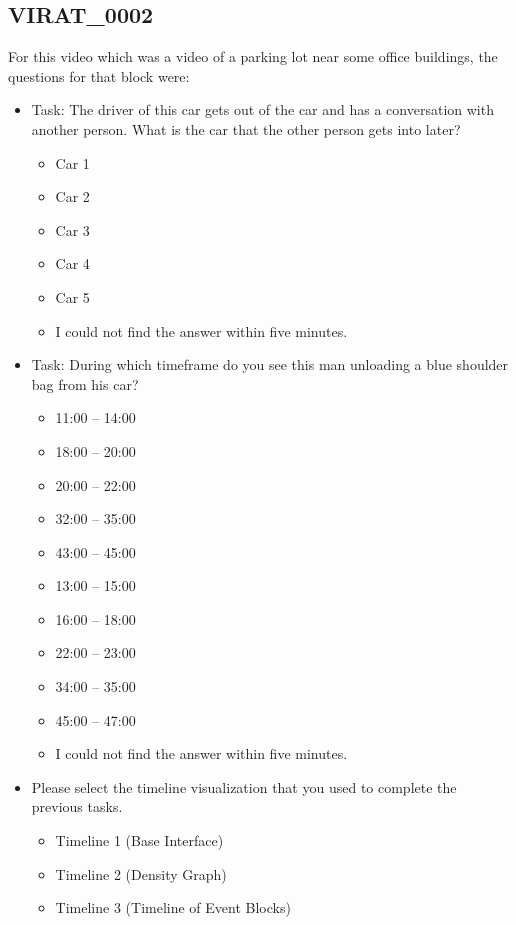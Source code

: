 \documentclass[doublespace,draft,nopageskip]{VTthesis} %
\begin{document}
\subsection{VIRAT_0002}

For this video which was a video of a parking lot near some office buildings, the questions for that block were: 

\begin{itemize}
    \item Task: The driver of this car gets out of the car and has a conversation with another person. What is the car that the other person gets into later?
    \begin{itemize}
        \item Car 1
        \item Car 2
        \item Car 3
        \item Car 4
        \item Car 5
        \item I could not find the answer within five minutes.
    \end{itemize}
    \item Task: During which timeframe do you see this man unloading a blue shoulder bag from his car?
    \begin{itemize}
        \item 11:00 – 14:00
        \item 18:00 – 20:00
        \item 20:00 – 22:00
        \item 32:00 – 35:00
        \item 43:00 – 45:00
        \item 13:00 – 15:00
        \item 16:00 – 18:00
        \item 22:00 – 23:00
        \item 34:00 – 35:00
        \item 45:00 – 47:00
        \item I could not find the answer within five minutes.
    \end{itemize}
    \item Please select the timeline visualization that you used to complete the previous tasks.
    \begin{itemize}
        \item Timeline 1 (Base Interface)
        \item Timeline 2 (Density Graph)
        \item Timeline 3 (Timeline of Event Blocks)

\end{itemize}
\end{itemize}
\end{document}
